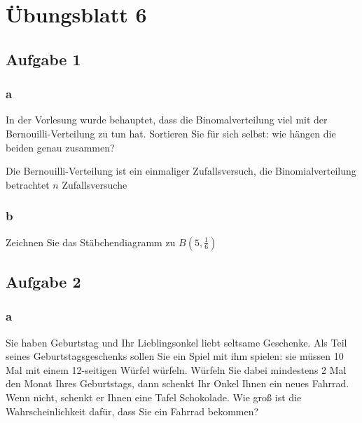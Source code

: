 \chapter{Übungsblatt 6}

\section{Aufgabe 1}

\subsection{a}
In der Vorlesung wurde behauptet, dass die Binomalverteilung viel mit der
Bernouilli-Verteilung zu tun hat. Sortieren Sie für sich selbst: wie hängen die
beiden genau zusammen?

Die Bernouilli-Verteilung ist ein einmaliger Zufallsversuch, die
Bino\-mial\-verteilung betrachtet $n$ Zufallsversuche

\subsection{b}
Zeichnen Sie das Stäbchendiagramm zu $B(5,\frac{1}{6})$


\section{Aufgabe 2}

\subsection{a}

Sie haben Geburtstag und Ihr Lieblingsonkel liebt seltsame Geschenke. Als Teil
seines Geburtstagsgeschenks sollen Sie ein Spiel mit ihm spielen: sie müssen 10
Mal mit einem 12-seitigen Würfel würfeln. Würfeln Sie dabei mindestens 2 Mal
den Monat Ihres Geburtstags, dann schenkt Ihr Onkel Ihnen ein neues Fahrrad.
Wenn nicht, schenkt er Ihnen eine Tafel Schokolade. Wie groß ist die
Wahrscheinlichkeit dafür, dass Sie ein Fahrrad bekommen?

